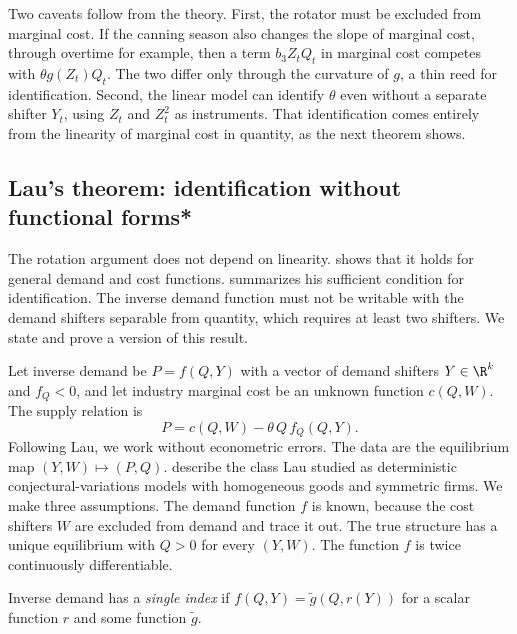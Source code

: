 Two caveats follow from the theory. First, the rotator must be excluded from marginal cost. If the canning season also
changes the slope of marginal cost, through overtime for example, then a term $b_3 Z_t Q_t$ in marginal cost competes with
$\theta g(Z_t) Q_t$. The two differ only through the curvature of $g$, a thin reed for identification. Second, the
linear model can identify $\theta$ even without a separate shifter $Y_t$, using $Z_t$ and $Z_t^2$ as instruments. That
identification comes entirely from the linearity of marginal cost in quantity, as the next theorem shows.

\subsection{Lau's theorem: identification without functional forms*}\label{sec:03-lau}

The rotation argument does not depend on linearity. \citet{Lau1982} shows that it holds for general demand and cost
functions. \citet[p.~1033]{Bresnahan1989} summarizes his sufficient condition for identification. The inverse demand
function must not be writable with the demand shifters separable from quantity, which requires at least two shifters.
We state and prove a version of this result.

Let inverse demand be $P = f(Q, Y)$ with a vector of demand shifters $Y \in \R^k$ and $f_Q < 0$, and let industry
marginal cost be an unknown function $c(Q, W)$. The supply relation is
\begin{equation}\label{eq:03-lau-model}
P = c(Q, W) - \theta\, Q\, f_Q(Q, Y) .
\end{equation}
Following Lau, we work without econometric errors. The data are the equilibrium map $(Y, W) \mapsto (P, Q)$.
\citet[p.~1776]{BerryHaile2014} describe the class Lau studied as deterministic conjectural-variations models with
homogeneous goods and symmetric firms. We make three assumptions. The demand function $f$ is known, because the cost
shifters $W$ are excluded from demand and trace it out. The true structure has a unique equilibrium with $Q > 0$ for
every $(Y, W)$. The function $f$ is twice continuously differentiable.

\begin{definition}\label{def:03-single-index}
Inverse demand has a \emph{single index} if $f(Q, Y) = \tilde g(Q, r(Y))$ for a scalar function $r$ and some
function $\tilde g$.
\end{definition}

